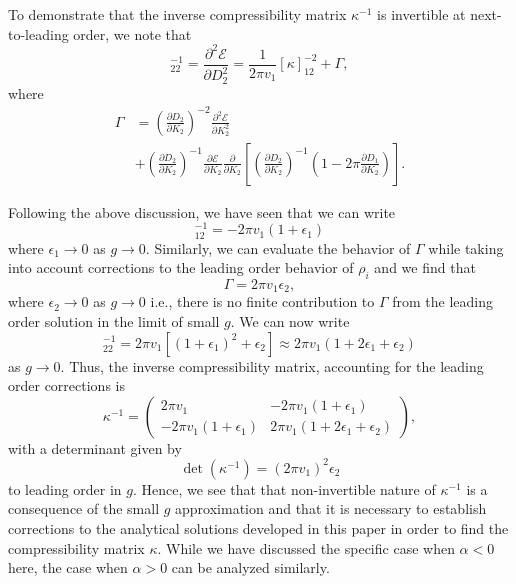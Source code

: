 \documentclass[aps,pra,
superscriptaddress,
reprint,twocolumn,preprintnumbers,
amsmath,amssymb,
nofootinbib]{revtex4-1}
\newcommand{\beq}{\begin{equation}}
\newcommand{\eeq}{\end{equation}}
\newcommand{\p}{\partial}
\begin{document}
To demonstrate that the inverse compressibility matrix $\kappa^{-1}$ is invertible at next-to-leading order, we note that 
\beq
[\kappa]_{22}^{-1} = \frac{\p^2 \mathcal{E}}{\p D_2^2} = \frac{1}{2\pi v_1} [\kappa]_{12}^{-2} + \Gamma,
\eeq
where
\begin{align}
\Gamma &= \left(\frac{\p D_2}{\p K_2}\right)^{-2} \frac{\p^2 \mathcal{E}}{\p K_2^2} \nonumber \\
&+ \left(\frac{\p D_2}{\p K_2} \right)^{-1} \frac{\p \mathcal{E}}{\p K_2} \frac{\p}{\p K_2} \left[\left(\frac{\p D_2}{\p K_2}\right)^{-1}\left(1 - 2 \pi \frac{\p D_1}{\p K_2} \right) \right].
\end{align}

Following the above discussion, we have seen that we can write 
\beq
[\kappa]_{12}^{-1} = -2 \pi v_1 (1 + \epsilon_1)
\eeq	
where $\epsilon_1 \to 0$ as $g \to 0$. Similarly, we can evaluate the behavior of $\Gamma$ while taking into account corrections to the leading order behavior of $\rho_i$ and we find that 
\beq
\Gamma = 2 \pi v_1 \epsilon_2,
\eeq
where $\epsilon_2 \to 0$ as $g \to 0$ i.e., there is no finite contribution to $\Gamma$ from the leading order solution in the limit of small $g$. We can now write 
\beq
[\kappa]_{22}^{-1} = 2 \pi v_1 [(1 + \epsilon_1)^2 + \epsilon_2] \approx 2\pi v_1(1 + 2\epsilon_1 + \epsilon_2)
\eeq
as $g \to 0$. Thus, the inverse compressibility matrix, accounting for the leading order corrections is 
\beq
\kappa^{-1} = \left( 
\begin{array}{cc}
2\pi v_1 & -2\pi v_1 (1 + \epsilon_1)\\
-2\pi v_1 (1 + \epsilon_1) & 2\pi v_1 (1 + 2\epsilon_1 + \epsilon_2) \end{array}
\right),
\eeq
with a determinant given by
\beq
\det(\kappa^{-1}) = (2 \pi v_1)^2 \epsilon_2
\eeq
to leading order in $g$. Hence, we see that that non-invertible nature of $\kappa^{-1}$ is a consequence of the small $g$ approximation and that it is necessary to establish corrections to the analytical solutions developed in this paper in order to find the compressibility matrix $\kappa$. While we have discussed the specific case when $\alpha<0$ here, the case when $\alpha>0$ can be analyzed similarly.
	
		

\newpage 



\end{document}
